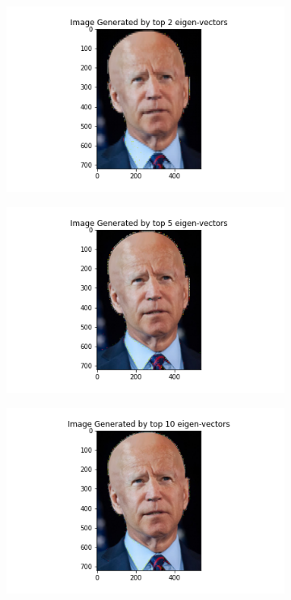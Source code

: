 \documentclass{article}
\begin{document}
\begin{figure}[h]
    \begin{subfigure}{0.2\linewidth}
        \centering
        \includegraphics[scale=0.2]{images/q4/joe/joe_2.png}
    \end{subfigure}
    \hfill
    \begin{subfigure}{0.2\linewidth}
        \centering
        \includegraphics[scale=0.2]{images/q4/joe/joe_5.png}
    \end{subfigure}
    \hfill
    \begin{subfigure}{0.2\linewidth}
        \centering
        \includegraphics[scale=0.2]{images/q4/joe/joe_10.png}

\end{subfigure}
\end{figure}
\end{document}

